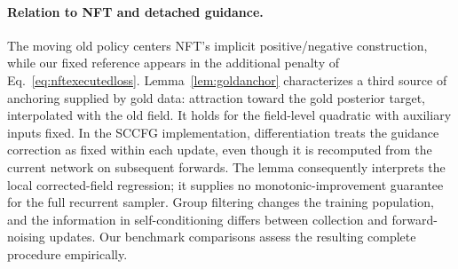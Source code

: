 \paragraph{Relation to NFT and detached guidance.}
The moving old policy centers NFT's implicit positive/negative construction, while our fixed reference appears in the additional penalty of Eq.~\eqref{eq:nftexecutedloss}. Lemma~\ref{lem:goldanchor} characterizes a third source of anchoring supplied by gold data: attraction toward the gold posterior target, interpolated with the old field. It holds for the field-level quadratic with auxiliary inputs fixed. In the SCCFG implementation, differentiation treats the guidance correction as fixed within each update, even though it is recomputed from the current network on subsequent forwards. The lemma consequently interprets the local corrected-field regression; it supplies no monotonic-improvement guarantee for the full recurrent sampler. Group filtering changes the training population, and the information in self-conditioning differs between collection and forward-noising updates. Our benchmark comparisons assess the resulting complete procedure empirically.
